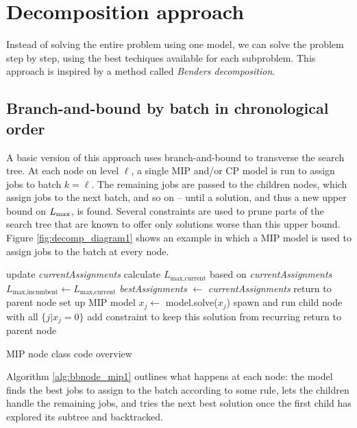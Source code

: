 \section{Decomposition approach}

Instead of solving the entire problem using one model, we can solve the problem
step by step, using the best techiques available for each subproblem. This
approach is inspired by a method called \textit{Benders decomposition}.

\subsection{Branch-and-bound by batch in chronological
order}\label{sec:mipdecomp}
A basic version of this approach uses branch-and-bound to transverse the search
tree. At each node on level $\ell$, a single MIP and/or CP model is run to
assign jobs to batch $k = \ell$. The remaining jobs are passed to the children
nodes, which assign jobs to the next batch, and so on -- until a solution, and
thus a new upper bound on $L_{\text{max}}$, is found. Several constraints are used to
prune parts of the search tree that are known to offer only solutions worse than
this upper bound. Figure \ref{fig:decomp_diagram1} shows an example in which a
MIP model is used to assign jobs to the batch at every node.
\begin{algorithm}[h]
\fontsize{9pt}{11.5pt}\selectfont
\begin{algorithmic}
\State update \textit{currentAssignments} 
 
  \State calculate $L_{\text{max,current}}$ based on \textit{currentAssignments}
    \State $L_{\text{max,incumbent}} \gets L_{\text{max,current}}$
    \State \textit{bestAssignments} $\gets$ \textit{currentAssignments}
  \EndIf
  \State return to parent node
\EndIf
\State set up MIP model 
\Repeat
  \State $x_j \gets$ model.solve($x_j$) 
  \State spawn and run child node with all $\{j | x_j = 0\}$ 
  \State add constraint to keep this solution from recurring 
\State return to parent node
\end{algorithmic}
\caption{MIP node class code overview}
\label{alg:bbnode_mip1}
\end{algorithm}
Algorithm \ref{alg:bbnode_mip1} outlines what happens at each node: the model
finds the best jobs to assign to the batch according to some rule, lets the
children handle the remaining jobs, and tries the next best solution once the
first child has explored its subtree and backtracked.
